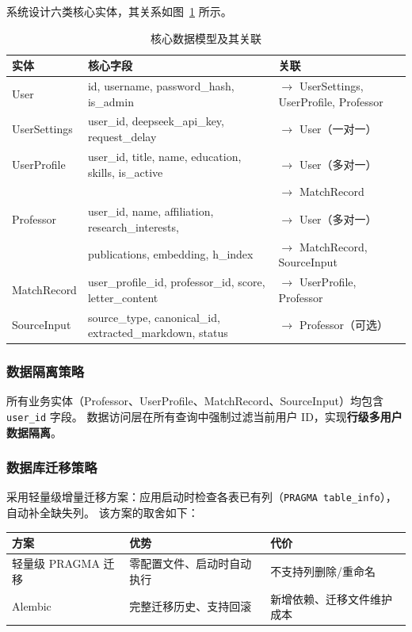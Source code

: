 \documentclass[11pt]{article}
\begin{document}
系统设计六类核心实体，其关系如图~\ref{fig:er} 所示。

\begin{table}[htbp]
\centering
\small
\begin{tabular}{|p{2.2cm}|p{5cm}|p{5.3cm}|}
\hline
\textbf{实体} & \textbf{核心字段} & \textbf{关联} \\
\hline
User & id, username, password\_hash, is\_admin & $\rightarrow$ UserSettings, UserProfile, Professor \\
\hline
UserSettings & user\_id, deepseek\_api\_key, request\_delay & $\rightarrow$ User（一对一） \\
\hline
UserProfile & user\_id, title, name, education, skills, is\_active & $\rightarrow$ User（多对一） \\
& & $\rightarrow$ MatchRecord \\
\hline
Professor & user\_id, name, affiliation, research\_interests, & $\rightarrow$ User（多对一） \\
& publications, embedding, h\_index & $\rightarrow$ MatchRecord, SourceInput \\
\hline
MatchRecord & user\_profile\_id, professor\_id, score, letter\_content & $\rightarrow$ UserProfile, Professor \\
\hline
SourceInput & source\_type, canonical\_id, extracted\_markdown, status & $\rightarrow$ Professor（可选） \\
\hline
\end{tabular}
\caption{核心数据模型及其关联}
\label{fig:er}
\end{table}

\subsubsection{数据隔离策略}

所有业务实体（Professor、UserProfile、MatchRecord、SourceInput）均包含 \texttt{user\_id} 字段。
数据访问层在所有查询中强制过滤当前用户 ID，实现\textbf{行级多用户数据隔离}。

\subsubsection{数据库迁移策略}

采用轻量级增量迁移方案：应用启动时检查各表已有列（\texttt{PRAGMA table\_info}），自动补全缺失列。
该方案的取舍如下：

\begin{center}
\begin{tabular}{|l|l|l|}
\hline
\textbf{方案} & \textbf{优势} & \textbf{代价} \\
\hline
轻量级 PRAGMA 迁移 & 零配置文件、启动时自动执行 & 不支持列删除/重命名 \\
Alembic & 完整迁移历史、支持回滚 & 新增依赖、迁移文件维护成本 \\
\hline
\end{tabular}
\end{center}
\end{document}
